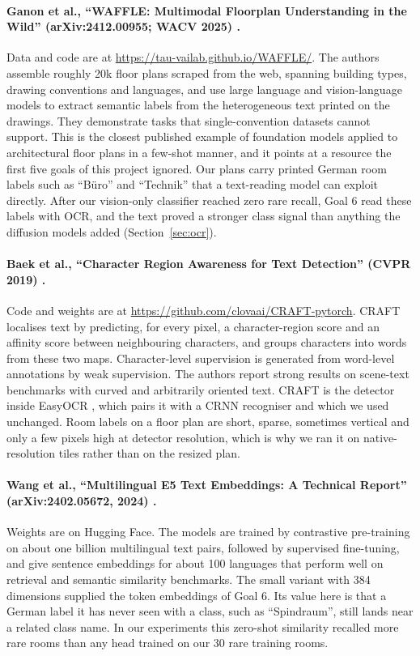 \paragraph{Ganon et al., ``WAFFLE: Multimodal Floorplan Understanding in the
Wild'' (arXiv:2412.00955; WACV 2025) \cite{ganon2025waffle}.} Data and code are
at \url{https://tau-vailab.github.io/WAFFLE/}. The authors assemble roughly 20k
floor plans scraped from the web, spanning building types, drawing conventions
and languages, and use large language and vision-language models to extract
semantic labels from the heterogeneous text printed on the drawings. They
demonstrate tasks that single-convention datasets cannot support. This is the
closest published example of foundation models applied to architectural floor
plans in a few-shot manner, and it points at a resource the first five goals of
this project ignored. Our plans carry printed German room labels such as
``B\"uro'' and ``Technik'' that a text-reading model can exploit directly.
After our vision-only classifier reached zero rare recall, Goal 6 read these
labels with OCR, and the text proved a stronger class signal than anything the
diffusion models added (Section~\ref{sec:ocr}).

\paragraph{Baek et al., ``Character Region Awareness for Text Detection''
(CVPR 2019) \cite{baek2019craft}.} Code and weights are at
\url{https://github.com/clovaai/CRAFT-pytorch}. CRAFT localises text by
predicting, for every pixel, a character-region score and an affinity score
between neighbouring characters, and groups characters into words from these
two maps. Character-level supervision is generated from word-level annotations
by weak supervision. The authors report strong results on scene-text benchmarks
with curved and arbitrarily oriented text. CRAFT is the detector inside
EasyOCR \cite{easyocr}, which pairs it with a CRNN recogniser
\cite{shi2017crnn} and which we used unchanged. Room labels on a floor plan are
short, sparse, sometimes vertical and only a few pixels high at detector
resolution, which is why we ran it on native-resolution tiles rather than on
the resized plan.

\paragraph{Wang et al., ``Multilingual E5 Text Embeddings: A Technical Report''
(arXiv:2402.05672, 2024) \cite{wang2024me5}.} Weights are on Hugging Face. The
models are trained by contrastive pre-training on about one billion
multilingual text pairs, followed by supervised fine-tuning, and give sentence
embeddings for about 100 languages that perform well on retrieval and semantic
similarity benchmarks. The small variant with 384 dimensions supplied the
token embeddings of Goal 6. Its value here is that a German label it has never
seen with a class, such as ``Spindraum'', still lands near a related class name.
In our experiments this zero-shot similarity recalled more rare rooms than any
head trained on our 30 rare training rooms.

